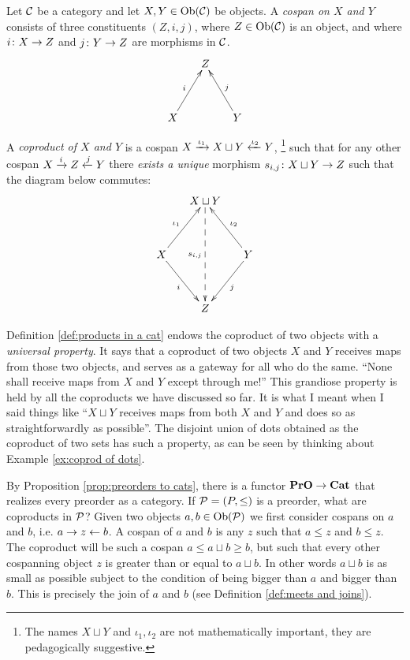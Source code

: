 \documentclass[CT4S-EN-RU]{subfiles}
\begin{document}
\begin{definitionENG}\label{def:coproducts in a cat}
Let $\mathcal{C}$ be a category and let $X,Y\in\textnormal{Ob}(\mathcal{C})$ be objects. A {\em cospan on $X$ and $Y$} consists of three constituents $(Z,i,j)$, where $Z\in\textnormal{Ob}(\mathcal{C})$ is an object, and where $i\colon X\rightarrow Z$ and $j\colon Y\rightarrow Z$ are morphisms in $\mathcal{C}$. 
$$\xymatrix@=15pt{&Z\\\\X\ar[ruu]^i&&Y\ar[luu]_j}$$   

A {\em coproduct of $X$ and $Y$} is a cospan $X\xrightarrow{\iota_1}X\sqcup Y\xleftarrow{\iota_2}Y$, \footnote{The names $X\sqcup Y$ and $\iota_1,\iota_2$ are not mathematically important, they are pedagogically suggestive.} such that for any other cospan $X\xrightarrow{i}Z\xleftarrow{j}Y$ there {\em exists a unique} morphism $s_{i,j}\colon X\sqcup Y\rightarrow Z$ such that the diagram below commutes:
$$
\xymatrix@=15pt{&X\sqcup Y\ar@{-->}[dddd]_{s_{i,j}}\\\\X\ar[uur]^{\iota_1}\ar[ddr]_i&&Y\ar[uul]_{\iota_2}\ar[ddl]^j\\\\&Z}
$$
\end{definitionENG}

\begin{definitionRUS}\label{def:coproducts in a cat}
\end{definitionRUS}

\begin{remarkENG}
Definition \ref{def:products in a cat} endows the coproduct of two objects with a {\em universal property}. It says that a coproduct of two objects $X$ and $Y$ receives maps from those two objects, and serves as a gateway for all who do the same. “None shall receive maps from $X$ and $Y$ except through me!” This grandiose property is held by all the coproducts we have discussed so far. It is what I meant when I said things like “$X\sqcup Y$ receives maps from both $X$ and $Y$ and does so as straightforwardly as possible”.  The disjoint union of dots obtained as the coproduct of two sets has such a property, as can be seen by thinking about Example \ref{ex:coprod of dots}.
\end{remarkENG}

\begin{remarkRUS}
\end{remarkRUS}

\begin{exampleENG}
By Proposition \ref{prop:preorders to cats}, there is a functor ${\mathbf{PrO}}\rightarrow{\mathbf{Cat}}$ that realizes every preorder as a category. If $\mathcal{P}=(P,\leq)$ is a preorder, what are coproducts in $\mathcal{P}$? Given two objects $a,b\in\textnormal{Ob}(\mathcal{P})$ we first consider cospans on $a$ and $b$, i.e. $a\rightarrow z\leftarrow b$. A cospan of $a$ and $b$ is any $z$ such that $a\leq z$ and $b\leq z$. The coproduct will be such a cospan $a\leq a\sqcup b\geq b$, but such that every other cospanning object $z$ is greater than or equal to $a\sqcup b$. In other words $a\sqcup b$ is as small as possible subject to the condition of being bigger than $a$ and bigger than $b$. This is precisely the join of $a$ and $b$ (see Definition \ref{def:meets and joins}).
\end{exampleENG}
\end{document}
